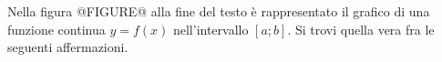 Nella figura @FIGURE@ alla fine del testo
è rappresentato il grafico di una funzione continua $y=f(x)$ 
nell’intervallo $[a; b]$. 
Si trovi quella vera fra le seguenti affermazioni.
